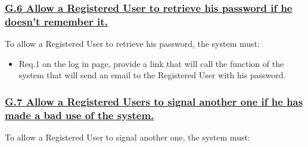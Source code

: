 \documentclass{report}
\begin{document}
			\subsubsection{\lbrack \hyperref[sec:g6]{G.6 Allow a Registered User to retrieve his password if he doesn't remember it.}\rbrack}
			To allow a Registered User to retrieve his password, the system must:

				\begin{itemize}
					\item \lbrack Req.1\rbrack \label{sec:fr1_g6} on the log in page, provide a link that will call the function of the system that will send an email to the Registered User with his password.
				\end{itemize}

			\subsubsection{\lbrack \hyperref[sec:g7]{G.7 Allow a Registered Users to signal another one if he has made a bad use of the system.}\rbrack}
			To allow a Registered User to signal another one, the system must:
\end{document}
